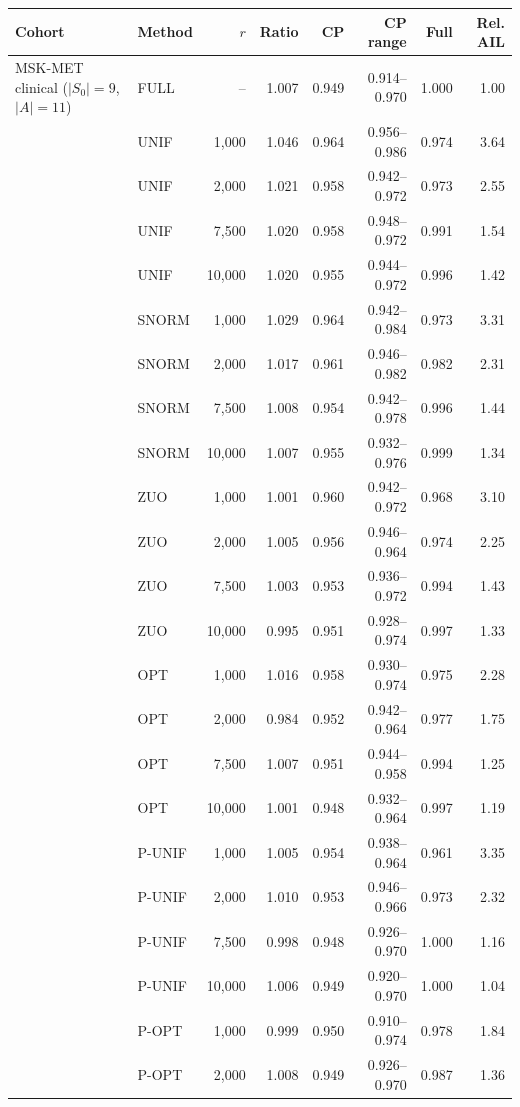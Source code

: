 \begin{tabular}{llrrrrrr}
\toprule
Cohort & Method & \(r\) & Ratio & CP & CP range & Full & Rel. AIL\\
\midrule
MSK-MET clinical (\(|S_0|=9\), \(|A|=11\)) & FULL & -- & 1.007 & 0.949 & 0.914--0.970 & 1.000 & 1.00\\
 & UNIF & 1,000 & 1.046 & 0.964 & 0.956--0.986 & 0.974 & 3.64\\
 & UNIF & 2,000 & 1.021 & 0.958 & 0.942--0.972 & 0.973 & 2.55\\
 & UNIF & 7,500 & 1.020 & 0.958 & 0.948--0.972 & 0.991 & 1.54\\
 & UNIF & 10,000 & 1.020 & 0.955 & 0.944--0.972 & 0.996 & 1.42\\
 & SNORM & 1,000 & 1.029 & 0.964 & 0.942--0.984 & 0.973 & 3.31\\
 & SNORM & 2,000 & 1.017 & 0.961 & 0.946--0.982 & 0.982 & 2.31\\
 & SNORM & 7,500 & 1.008 & 0.954 & 0.942--0.978 & 0.996 & 1.44\\
 & SNORM & 10,000 & 1.007 & 0.955 & 0.932--0.976 & 0.999 & 1.34\\
 & ZUO & 1,000 & 1.001 & 0.960 & 0.942--0.972 & 0.968 & 3.10\\
 & ZUO & 2,000 & 1.005 & 0.956 & 0.946--0.964 & 0.974 & 2.25\\
 & ZUO & 7,500 & 1.003 & 0.953 & 0.936--0.972 & 0.994 & 1.43\\
 & ZUO & 10,000 & 0.995 & 0.951 & 0.928--0.974 & 0.997 & 1.33\\
 & OPT & 1,000 & 1.016 & 0.958 & 0.930--0.974 & 0.975 & 2.28\\
 & OPT & 2,000 & 0.984 & 0.952 & 0.942--0.964 & 0.977 & 1.75\\
 & OPT & 7,500 & 1.007 & 0.951 & 0.944--0.958 & 0.994 & 1.25\\
 & OPT & 10,000 & 1.001 & 0.948 & 0.932--0.964 & 0.997 & 1.19\\
 & P-UNIF & 1,000 & 1.005 & 0.954 & 0.938--0.964 & 0.961 & 3.35\\
 & P-UNIF & 2,000 & 1.010 & 0.953 & 0.946--0.966 & 0.973 & 2.32\\
 & P-UNIF & 7,500 & 0.998 & 0.948 & 0.926--0.970 & 1.000 & 1.16\\
 & P-UNIF & 10,000 & 1.006 & 0.949 & 0.920--0.970 & 1.000 & 1.04\\
 & P-OPT & 1,000 & 0.999 & 0.950 & 0.910--0.974 & 0.978 & 1.84\\
 & P-OPT & 2,000 & 1.008 & 0.949 & 0.926--0.970 & 0.987 & 1.36\\

\end{tabular}
